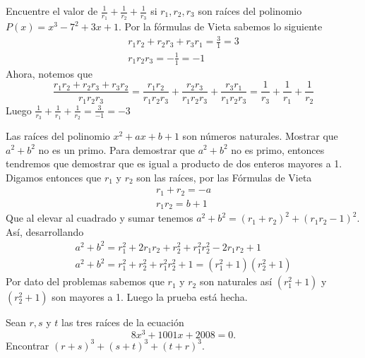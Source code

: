 {    \begin{example}
        Encuentre el valor de $\frac{1}{r_1} + \frac{1}{r_2} + \frac{1}{r_3}$ si $r_1, r_2, r_3$ son raíces del polinomio $P(x) = x^3 - 7^2 + 3x + 1$.
        \solution
        {
            Por la fórmulas de Vieta sabemos lo siguiente
            \begin{gather*}
                r_1 r_2 + r_2 r_3 + r_3 r_1 = \frac{3}{1} = 3 \\
                r_1 r_2 r_3 = - \frac{1}{1} = -1
            \end{gather*}
            Ahora, notemos que
            \[\frac{r_1 r_2 + r_2 r_3 + r_3 r_2}{r_1 r_2 r_3} = \frac{r_1 r_2}{r_1 r_2 r_3} + \frac{r_2 r_3}{r_1 r_2 r_3} + \frac{r_3 r_1}{r_1 r_2 r_3} = \frac{1}{r_3} + \frac{1}{r_1} + \frac{1}{r_2}\]
            Luego $\frac{1}{r_3} + \frac{1}{r_1} + \frac{1}{r_2} = \frac{3}{-1} = \boxed{-3}$
        }
    \end{example}

    \begin{example}[1986 URSS]
        Las raíces del polinomio $x^2 + ax + b + 1$ son números naturales. Mostrar que $a^2 + b^2$ no es un primo.
        \solution
        {
            Para demostrar que $a^2 + b^2$ no es primo, entonces tendremos que demostrar que es igual a producto de dos enteros mayores a 1.
            Digamos entonces que $r_1$ y $r_2$ son las raíces, por las Fórmulas de Vieta
            \begin{gather*}
                r_1 + r_2 = -a\\
                r_1 r_2 = b + 1
            \end{gather*}
            Que al elevar al cuadrado y sumar tenemos $a^2 + b^2 = (r_1 + r_2)^2 + (r_1 r_2 - 1)^2$. Así, desarrollando
            \begin{gather*}
                a^2 + b^2 = r^2_1 + 2r_1 r_2 + r^2_2 + r^2_1 r^2_2 - 2r_1 r_2 + 1 \\
                a^2 + b^2 = r^2_1 + r^2_2 + r^2_1 r^2_2+ 1 = \boxed{(r^2_1 + 1)(r^2_2 + 1)}
            \end{gather*}
            Por dato del problemas sabemos que $r_1$ y $r_2$ son naturales así $(r^2_1 + 1)$ y $(r^2_2 + 1)$ son mayores a 1.
            Luego la prueba está hecha.
        }
    \end{example}

    \begin{example}[2008 AIME II #7]
        Sean $r, s$ y $t$ las tres raíces de la ecuación
        \[8x^3 + 1001x + 2008 = 0.\]
        Encontrar $(r + s)^3 + (s + t)^3 + (t + r)^3.$


\end{example}}
